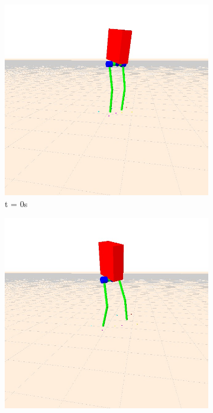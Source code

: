 \documentclass[letterpaper, 10 pt, conference]{ieeeconf}  %
\begin{document}
\begin{figure}[tbp]
  \centering
  \begin{subfigure}[b]{0.3\textwidth}
    \centering
        \includegraphics[width=\textwidth] {figures/balanceYaw1.jpg}
        \caption{t = 0s}
    \label{fig:balanceYaw1}
    \end{subfigure}\hfill
    \begin{subfigure}[b]{0.3\textwidth}
    \centering
        \includegraphics[width=\textwidth] {figures/balanceYaw2.jpg}

\end{subfigure}
\end{figure}
\end{document}
